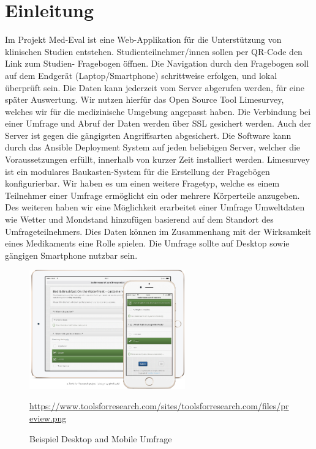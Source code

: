 \chapter{Einleitung}
Im Projekt Med-Eval ist eine Web-Applikation für die Unterstützung
von klinischen Studien entstehen. 
Studienteilnehmer/innen sollen per QR-Code den Link zum Studien-
Fragebogen öffnen. Die Navigation durch den Fragebogen soll auf dem Endgerät
(Laptop/Smartphone) schrittweise erfolgen, und lokal überprüft sein.
Die Daten kann jederzeit vom Server abgerufen werden, für eine später Auswertung.
Wir nutzen hierfür das Open Source Tool Limesurvey, welches wir für die
medizinische Umgebung angepasst haben.
Die Verbindung bei einer Umfrage und Abruf der Daten werden über SSL gesichert werden.
Auch der Server ist gegen die gängigsten Angriffsarten abgesichert.
Die Software kann durch das Ansible Deployment System auf jeden beliebigen Server, welcher die Voraussetzungen erfüllt,
innerhalb von kurzer Zeit installiert werden.
Limesurvey ist ein modulares Baukasten-System für die Erstellung der Fragebögen konfigurierbar.
Wir haben es um einen weitere Fragetyp, welche es einem Teilnehmer einer Umfrage ermöglicht
ein oder mehrere Körperteile anzugeben.
Des weiteren haben wir eine Möglichkeit erarbeitet einer Umfrage Umweltdaten wie Wetter und Mondstand
hinzufügen basierend auf dem Standort des Umfrageteilnehmers. Dies Daten können im Zusammenhang mit der Wirksamkeit eines
Medikaments eine Rolle spielen.
Die Umfrage sollte auf Desktop sowie gängigen Smartphone nutzbar sein.

\begin{figure}[!ht]
\centering
\includegraphics[width=0.6\textwidth]{content/pictures/preview.png}
\caption{Beispiel Desktop and Mobile Umfrage}
\url{https://www.toolsforresearch.com/sites/toolsforresearch.com/files/preview.png}
\label{fig_holo3}
\end{figure}


